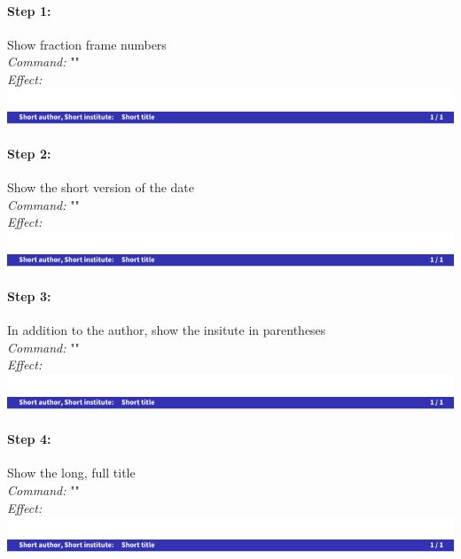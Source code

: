 \documentclass[11pt]{ltxdoc}
\begin{document}
	\paragraph{Step 1:} Show fraction frame numbers \\
	\textit{Command:} "" \\
	\textit{Effect:} \\
	\includegraphics[page=5, width=\textwidth, trim=0 0 0 15, clip]{hackthefootline-examples}
	
	\paragraph{Step 2:} Show the short version of the date \\
	\textit{Command:} "" \\
	\textit{Effect:} \\
	\includegraphics[page=6, width=\textwidth, trim=0 0 0 15, clip]{hackthefootline-examples}
	
	\paragraph{Step 3:} In addition to the author, show the insitute in parentheses \\
	\textit{Command:} "" \\
	\textit{Effect:} \\
	\includegraphics[page=7, width=\textwidth, trim=0 0 0 15, clip]{hackthefootline-examples}
	
	\paragraph{Step 4:} Show the long, full title \\
	\textit{Command:} "" \\
	\textit{Effect:} \\
	\includegraphics[page=8, width=\textwidth, trim=0 0 0 15, clip]{hackthefootline-examples}
	
\end{document}
